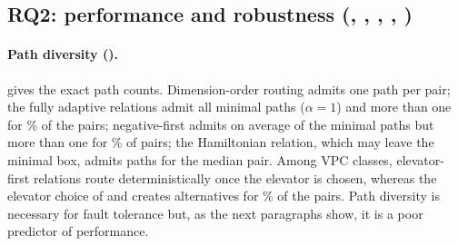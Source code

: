 \subsection{RQ2: performance and robustness (, , , , )}
\label{sec:rq-perf}

\paragraph{Path diversity ().}  gives the exact path counts. Dimension-order routing admits one path per pair; the fully adaptive relations admit all minimal paths ($\alpha=1$) and more than one for \% of the pairs; negative-first admits on average  of the minimal paths but more than one for \% of pairs; the Hamiltonian relation, which may leave the minimal box, admits  paths for the median pair. Among VPC classes, elevator-first relations route deterministically once the elevator is chosen, whereas the elevator choice of  and  creates alternatives for \% of the pairs. Path diversity is necessary for fault tolerance but, as the next paragraphs show, it is a poor predictor of performance.

\begin{table}[tbp]
\centering
\caption{Path diversity (), exact enumeration on the fault-free mesh. $\alpha$: mean fraction of minimal paths admitted (undefined for non-minimal and VPC relations).}
\label{tab:d2}
\small

\end{table}


